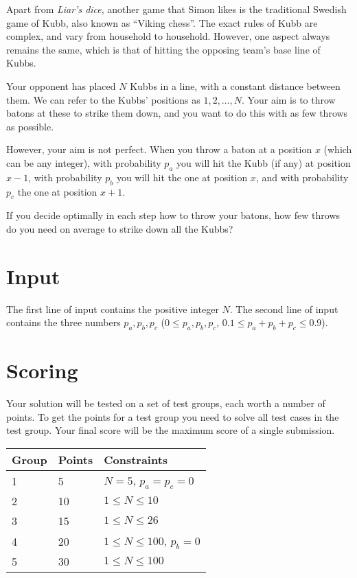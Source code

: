 Apart from \emph{Liar's dice}, another game that Simon likes is the traditional Swedish game of Kubb,
also known as ``Viking chess''.
The exact rules of Kubb are complex, and vary from household to household.
However, one aspect always remains the same, which is that of hitting the opposing team's base line of Kubbs.

Your opponent has placed $N$ Kubbs in a line, with a constant distance between them.
We can refer to the Kubbs' positions as $1, 2, \dots, N$.
Your aim is to throw batons at these to strike them down, and
you want to do this with as few throws as possible.

However, your aim is not perfect. When you throw a baton at a position $x$ (which can be any integer),
with probability $p_a$ you will hit the Kubb (if any) at position $x-1$,
with probability $p_b$ you will hit the one at position $x$, and
with probability $p_c$ the one at position $x+1$.

If you decide optimally in each step how to throw your batons,
how few throws do you need on average to strike down all the Kubbs?

\section*{Input}
The first line of input contains the positive integer $N$.
The second line of input contains the three numbers $p_a, p_b, p_c$ ($0 \le p_a, p_b, p_c$, $0.1 \le p_a + p_b + p_c \le 0.9$).

\section*{Scoring}
Your solution will be tested on a set of test groups, each worth a number of points.
To get the points for a test group you need to solve all test cases in the test group.
Your final score will be the maximum score of a single submission.

\noindent
\begin{tabular}{| l | l | l |}
\hline
Group & Points & Constraints \\ \hline
1     & 5      & $N = 5$, $p_a = p_c = 0$ \\ \hline
2     & 10     & $1 \le N \le 10$ \\ \hline
3     & 15     & $1 \le N \le 26$ \\ \hline
4     & 20     & $1 \le N \le 100$, $p_b = 0$ \\ \hline
5     & 30     & $1 \le N \le 100$ \\ \hline
\end{tabular}

